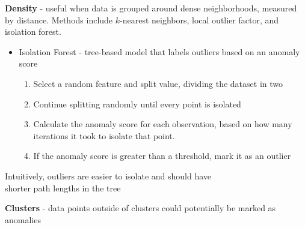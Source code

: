 \documentclass[10pt,landscape]{article}
\begin{document}
\begin{multicols}{3}
\textbf{Density} - useful when data is grouped around dense neighborhoods, measured by distance. Methods include $k$-nearest neighbors, local outlier factor, and isolation forest.
\begin{itemize}[label={--},leftmargin=4mm]
\itemsep -.4mm
\item Isolation Forest - tree-based model that labels outliers based on an anomaly score\\
\vspace{-1.5mm}
\begin{enumerate}[leftmargin=4mm]
\itemsep -.4mm
\item Select a random feature and split value, dividing the dataset in two
\item Continue splitting randomly until every point is isolated
\item Calculate the anomaly score for each observation, based on how many iterations it took to isolate that point.
\item If the anomaly score is greater than a threshold, mark it as an outlier
\end{enumerate}
\end{itemize}
\vspace{-2.5mm}
\hspace{4mm}Intuitively, outliers are easier to isolate and should have\\\hspace{4mm}shorter path lengths in the tree

\vspace{1mm}
\textbf{Clusters} - data points outside of clusters could potentially be marked as anomalies


\end{multicols}
\end{document}
